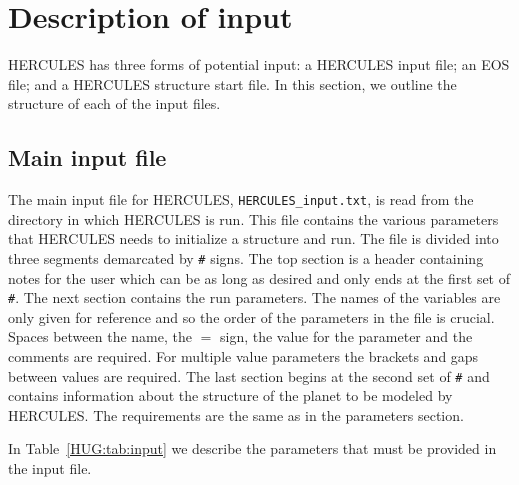 \documentclass[11pt, oneside]{article}   	%
\begin{document}
\section{Description of input}
\label{HUG:sec:input}

HERCULES has three forms of potential input: a HERCULES input file; an EOS file; and a HERCULES structure start file.
In this section, we outline the structure of each of the input files.

\subsection{Main input file}

The main input file for HERCULES, \texttt{HERCULES\_input.txt}, is read from the directory in which HERCULES is run. 
This file contains the various parameters that HERCULES needs to initialize a structure and run.
The file is divided into three segments demarcated by \texttt{\#} signs.
The top section is a header containing notes for the user which can be as long as desired and only ends at the first set of \texttt{\#}.
The next section contains the run parameters.
The names of the variables are only given for reference and so the order of the parameters in the file is crucial. 
Spaces between the name, the $=$ sign, the value for the parameter and the comments are required.
For multiple value parameters the brackets and gaps between values are required.
The last section begins at the second set of \texttt{\#} and contains information about the structure of the planet to be modeled by HERCULES.
The requirements are the same as in the parameters section.

In Table~\ref{HUG:tab:input} we describe the parameters that must be provided in the input file.
\end{document}

